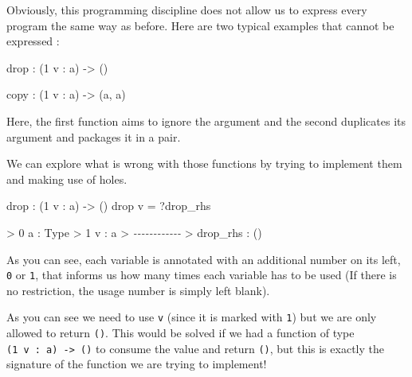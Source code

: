 \documentclass[
]{article}
\newenvironment{Shaded}{}{}
\newcommand{\CommentTok}[1]{\textcolor[rgb]{0.38,0.63,0.69}{\textit{#1}}}
\newcommand{\DataTypeTok}[1]{\textcolor[rgb]{0.56,0.13,0.00}{#1}}
\newcommand{\DecValTok}[1]{\textcolor[rgb]{0.25,0.63,0.44}{#1}}
\newcommand{\FunctionTok}[1]{\textcolor[rgb]{0.02,0.16,0.49}{#1}}
\newcommand{\NormalTok}[1]{#1}
\newcommand{\OperatorTok}[1]{\textcolor[rgb]{0.40,0.40,0.40}{#1}}
\newcommand{\OtherTok}[1]{\textcolor[rgb]{0.00,0.44,0.13}{#1}}
\begin{document}
Obviously, this programming discipline does not allow us to express
every program the same way as before. Here are two typical examples that
cannot be expressed :

\begin{Shaded}
\begin{Highlighting}[]
\FunctionTok{drop} \OperatorTok{:}\NormalTok{ (}\DecValTok{1}\NormalTok{ v }\OperatorTok{:}\NormalTok{ a) }\OtherTok{{-}\textgreater{}}\NormalTok{ ()}

\NormalTok{copy }\OperatorTok{:}\NormalTok{ (}\DecValTok{1}\NormalTok{ v }\OperatorTok{:}\NormalTok{ a) }\OtherTok{{-}\textgreater{}}\NormalTok{ (a, a)}
\end{Highlighting}
\end{Shaded}

Here, the first function aims to ignore the argument and the second
duplicates its argument and packages it in a pair.

We can explore what is wrong with those functions by trying to implement
them and making use of holes.

\begin{Shaded}
\begin{Highlighting}[]
\FunctionTok{drop} \OperatorTok{:}\NormalTok{ (}\DecValTok{1}\NormalTok{ v }\OperatorTok{:}\NormalTok{ a) }\OtherTok{{-}\textgreater{}}\NormalTok{ ()}
\FunctionTok{drop}\NormalTok{ v }\OtherTok{=} \OperatorTok{?}\NormalTok{drop\_rhs}
\end{Highlighting}
\end{Shaded}

\begin{Shaded}
\begin{Highlighting}[]
\OperatorTok{\textgreater{}} \DecValTok{0}\NormalTok{ a }\OperatorTok{:} \DataTypeTok{Type}
\OperatorTok{\textgreater{}} \DecValTok{1}\NormalTok{ v }\OperatorTok{:}\NormalTok{ a}
\OperatorTok{\textgreater{}} \CommentTok{{-}{-}{-}{-}{-}{-}{-}{-}{-}{-}{-}{-}}
\OperatorTok{\textgreater{}}\NormalTok{ drop\_rhs }\OperatorTok{:}\NormalTok{ ()}
\end{Highlighting}
\end{Shaded}

As you can see, each variable is annotated with an additional number on
its left, \texttt{0} or \texttt{1}, that informs us how many times each
variable has to be used (If there is no restriction, the usage number is
simply left blank).

As you can see we need to use \texttt{v} (since it is marked with
\texttt{1}) but we are only allowed to return \texttt{()}. This would be
solved if we had a function of type
\texttt{(1\ v\ :\ a)\ -\textgreater{}\ ()} to consume the value and
return \texttt{()}, but this is exactly the signature of the function we
are trying to implement!
\end{document}
